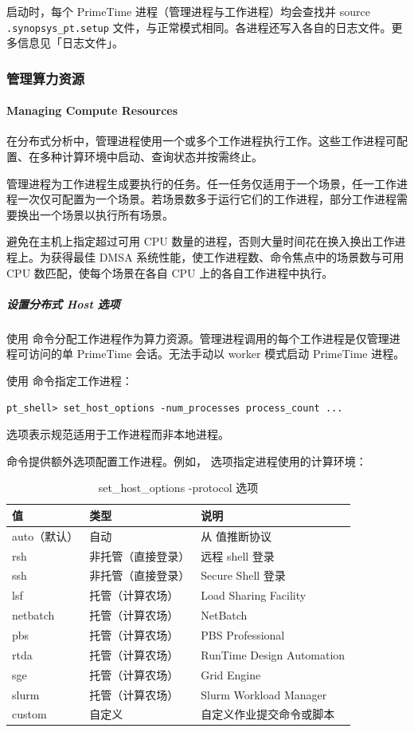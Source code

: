 启动时，每个 PrimeTime 进程（管理进程与工作进程）均会查找并 source \texttt{.synopsys\_pt.setup} 文件，与正常模式相同。各进程还写入各自的日志文件。更多信息见「日志文件」。

\subsubsection{管理算力资源}
\paragraph*{Managing Compute Resources}

在分布式分析中，管理进程使用一个或多个工作进程执行工作。这些工作进程可配置、在多种计算环境中启动、查询状态并按需终止。

管理进程为工作进程生成要执行的任务。任一任务仅适用于一个场景，任一工作进程一次仅可配置为一个场景。若场景数多于运行它们的工作进程，部分工作进程需要换出一个场景以执行所有场景。

避免在主机上指定超过可用 CPU 数量的进程，否则大量时间花在换入换出工作进程上。为获得最佳 DMSA 系统性能，使工作进程数、命令焦点中的场景数与可用 CPU 数匹配，使每个场景在各自 CPU 上的各自工作进程中执行。

\subparagraph{设置分布式 Host 选项}
使用  命令分配工作进程作为算力资源。管理进程调用的每个工作进程是仅管理进程可访问的单 PrimeTime 会话。无法手动以 worker 模式启动 PrimeTime 进程。

使用  命令指定工作进程：
\begin{lstlisting}
pt_shell> set_host_options -num_processes process_count ...
\end{lstlisting}
 选项表示规范适用于工作进程而非本地进程。

 命令提供额外选项配置工作进程。例如， 选项指定进程使用的计算环境：

\begin{table}[htbp]
\centering
\caption{set\_host\_options -protocol 选项}
\small
\begin{tabular}{|l|l|L{6.5cm}|}
\hline
{} 值 & 类型 & 说明 \\
\hline
auto（默认） & 自动 & 从  值推断协议 \\
rsh & 非托管（直接登录） & 远程 shell 登录 \\
ssh & 非托管（直接登录） & Secure Shell 登录 \\
lsf & 托管（计算农场） & Load Sharing Facility \\
netbatch & 托管（计算农场） & NetBatch \\
pbs & 托管（计算农场） & PBS Professional \\
rtda & 托管（计算农场） & RunTime Design Automation \\
sge & 托管（计算农场） & Grid Engine \\
slurm & 托管（计算农场） & Slurm Workload Manager \\
custom & 自定义 & 自定义作业提交命令或脚本 \\
\hline
\end{tabular}
\end{table}

